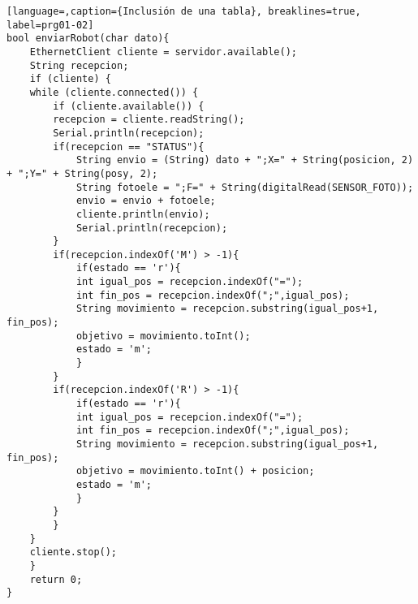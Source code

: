 \begin{lstlisting}[language=,caption={Inclusión de una tabla}, breaklines=true, label=prg01-02]
bool enviarRobot(char dato){
    EthernetClient cliente = servidor.available();
    String recepcion;
    if (cliente) {
    while (cliente.connected()) {
        if (cliente.available()) {
        recepcion = cliente.readString();
        Serial.println(recepcion);
        if(recepcion == "STATUS"){
            String envio = (String) dato + ";X=" + String(posicion, 2) + ";Y=" + String(posy, 2);
            String fotoele = ";F=" + String(digitalRead(SENSOR_FOTO));
            envio = envio + fotoele;
            cliente.println(envio);
            Serial.println(recepcion);
        }
        if(recepcion.indexOf('M') > -1){
            if(estado == 'r'){
            int igual_pos = recepcion.indexOf("=");
            int fin_pos = recepcion.indexOf(";",igual_pos);
            String movimiento = recepcion.substring(igual_pos+1, fin_pos);
            objetivo = movimiento.toInt();
            estado = 'm';
            }
        }
        if(recepcion.indexOf('R') > -1){
            if(estado == 'r'){
            int igual_pos = recepcion.indexOf("=");
            int fin_pos = recepcion.indexOf(";",igual_pos);
            String movimiento = recepcion.substring(igual_pos+1, fin_pos);
            objetivo = movimiento.toInt() + posicion;
            estado = 'm';
            }
        }
        }
    }
    cliente.stop();
    }
    return 0;
}    
\end{lstlisting}